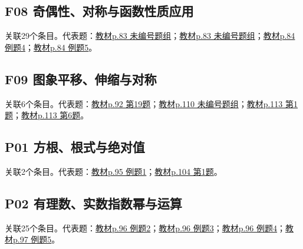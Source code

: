 \par\medskip\noindent\begin{minipage}{\linewidth}\subsection{F08 奇偶性、对称与函数性质应用}关联29个条目。代表题：\hyperref[XJ-B1-C03-TH-P083-Y0277]{教材p.83 未编号题组}；\hyperref[XJ-B1-C03-TH-P083-Y0867]{教材p.83 未编号题组}；\hyperref[XJ-B1-C03-EX-P084-Y0177]{教材p.84 例题4}；\hyperref[XJ-B1-C03-EX-P084-Y0592]{教材p.84 例题5}。\end{minipage}\par
\par\medskip\noindent\begin{minipage}{\linewidth}\subsection{F09 图象平移、伸缩与对称}关联6个条目。代表题：\hyperref[XJ-B1-C03-RV-P092-Y1067]{教材p.92 第19题}；\hyperref[XJ-B1-C04-TH-P110-Y1359]{教材p.110 未编号题组}；\hyperref[XJ-B1-C04-PR-P113-Y0217]{教材p.113 第1题}；\hyperref[XJ-B1-C04-HW-P113-Y1566]{教材p.113 第6题}。\end{minipage}\par
\par\medskip\noindent\begin{minipage}{\linewidth}\subsection{P01 方根、根式与绝对值}关联2个条目。代表题：\hyperref[XJ-B1-C04-EX-P095-Y0782]{教材p.95 例题1}；\hyperref[XJ-B1-C04-HW-P104-Y0450]{教材p.104 第1题}。\end{minipage}\par
\par\medskip\noindent\begin{minipage}{\linewidth}\subsection{P02 有理数、实数指数幂与运算}关联25个条目。代表题：\hyperref[XJ-B1-C04-EX-P096-Y0533]{教材p.96 例题2}；\hyperref[XJ-B1-C04-EX-P096-Y0978]{教材p.96 例题3}；\hyperref[XJ-B1-C04-EX-P096-Y1306]{教材p.96 例题4}；\hyperref[XJ-B1-C04-EX-P097-Y0403]{教材p.97 例题5}。\end{minipage}\par
